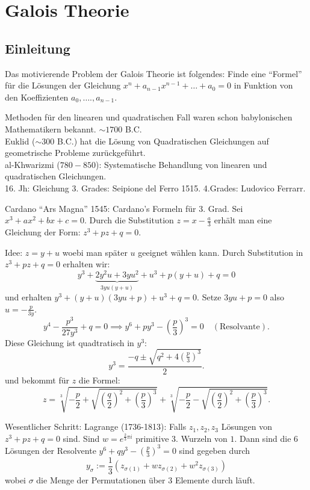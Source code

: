 \graphicspath{{Images/}}

\chapter{Galois Theorie}

\section{Einleitung}
Das motivierende Problem der Galois Theorie ist folgendes:
Finde eine \enquote{Formel} für die Lösungen der Gleichung
$x^{n} + a_{n-1} x^{n-1} + \ldots + a_0 = 0$ in Funktion von den Koeffizienten $a_0,\ldots.,a_{n-1}$.

Methoden für den linearen und quadratischen Fall waren schon babylonischen Mathematikern bekannt.  $\sim 1700$ B.C.\\
Euklid ($\sim 300$ B.C.) hat die Lösung von Quadratischen Gleichungen auf geometrische Probleme zurückgeführt.\\
al-Khwarizmi ($780 - 850$): Systematische Behandlung von linearen und quadratischen Gleichungen.\\
16. Jh: Gleichung 3. Grades: Seipione del Ferro 1515. 4.Grades: Ludovico Ferrarr.

Cardano \enquote{Ars Magna} 1545: Cardano's Formeln für  3. Grad.
Sei $x^{3} + a x^{2} + bx + c = 0$. Durch die Substitution $z = x - \frac{a}{3}$ erhält man eine Gleichung der Form:
$z^3 + p z + q = 0$.

Idee: $z = y + u$ woebi man später  $u$ geeignet wählen kann. Durch Substitution in $z^3 + pz + q = 0$ erhalten wir:
\[
	y^3 + \underbrace{2y^2 u + 3yu^2}_{3yu (y+u)} + u^3 + p(y+u) + q = 0
\] 
und erhalten $y^3 + (y+u)(3yu + p) + u^3 + q = 0$.
Setze $3yu +p = 0$ also $u = -\frac{p}{3y}$.
\[
	y^{4} - \frac{p^3}{27 y^3} + q = 0 \implies y^{6} + p y^3 - (\frac{p}{3})^3 = 0 \quad (\text{Resolvante})
.\] 
Diese Gleichung ist quadtratisch in $y^3$:
\[
	y^3 = \frac{-q \pm \sqrt{q^2 + 4 (\frac{p}{3})^3} }{2}
.\] 
und bekommt für $z$ die Formel:
\[
	z = \sqrt[3]{-\frac{p}{2} + \sqrt{\left(\frac{q}{2}\right)^2 + \left(\frac{p}{3}\right)^3}} + \sqrt[3]{-\frac{p}{2} - \sqrt{\left(\frac{q}{2}\right)^2 + \left(\frac{p}{3}\right)^3}} 
.\] 

Wesentlicher Schritt: Lagrange (1736-1813): Falls $z_1, z_2, z_3$ Lösungen von $z^3 + pz + q = 0$ sind.
Sind $w = e^{\frac{2}{3}\pi i }$ primitive 3. Wurzeln von $1$. Dann sind die $6$ Lösungen der Resolvente
$y^6 + q y^3 - \left( \frac{p}{3} \right)^3 = 0$ sind gegeben durch
\[
	y_{\sigma} := \frac{1}{3}\left( z_{\sigma(1)} + w z_{\sigma(2)} + w^2 z_{\sigma(3)} \right) 
\] 
wobei $\sigma$ die Menge der Permutationen über $3$ Elemente durch läuft.

